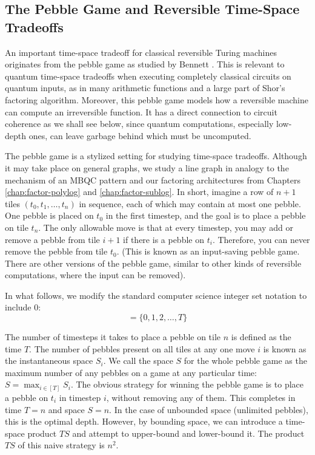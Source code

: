 

\subsection{The Pebble Game and Reversible Time-Space Tradeoffs}
\label{subsec:cohere-pebble}

An important time-space tradeoff for classical reversible Turing machines
originates from the pebble game as studied by Bennett \cite{Bennett1973}.
This is relevant to quantum time-space tradeoffs when executing
completely classical circuits on quantum inputs, as in many arithmetic
functions and a large part of Shor's factoring algorithm. Moreover, this
pebble game models how a reversible machine can compute an irreversible
function. It has a direct connection to circuit coherence as we shall see
below, since quantum computations, especially low-depth ones, can leave
garbage behind which must be uncomputed.

The pebble game is a stylized setting for studying time-space tradeoffs.
Although it may take place on general graphs, we study a line graph
in analogy to the mechanism of an MBQC pattern and our factoring architectures
from Chapters \ref{chap:factor-polylog} and \ref{chap:factor-sublog}.
In short, imagine a row of $n+1$ tiles $(t_0, t_1, \ldots, t_n)$
in sequence, each of which may
contain at most one pebble. One pebble is placed
on $t_0$ in the first timestep, and the goal is to place a pebble
on tile $t_n$. The only allowable move is that at every timestep,
you may add or remove a pebble from tile $i+1$ if there is a pebble on
$t_i$. Therefore, you can never remove the pebble from tile $t_0$.
(This is known as an input-saving pebble game.
There are other versions of the pebble game, similar to other kinds of
reversible computations, where the input can be removed).

In what follows, we modify the standard computer science integer set notation
to include $0$:
\begin{equation}
[T] = \{0, 1, 2, \ldots, T \}
\end{equation}

The number of timesteps it takes to place a pebble on tile $n$ is defined
as the time $T$.
The number of pebbles present on all tiles at any one move $i$
is known as the instantaneous space $S_i$. We call the space $S$ for the whole pebble
game as the maximum number of any pebbles on a game at any particular time:
$S = \max_{i \in [T]} S_i$.
The obvious strategy for winning the pebble game is
to place a pebble on $t_i$ in timestep $i$, without removing any of them.
This completes in time $T=n$ and space $S = n$. In the case of unbounded
space (unlimited pebbles), this is the optimal depth. However, by
bounding space, we can introduce a time-space product $TS$ and attempt to
upper-bound and lower-bound it. The product $TS$ of this naive strategy
is $n^2$.


